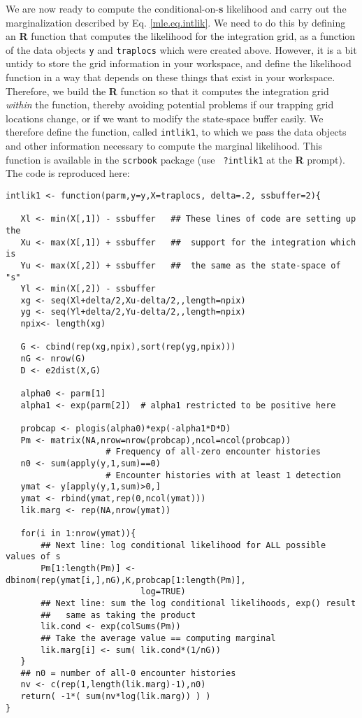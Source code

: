 We are now ready to compute the conditional-on-{\bf s} likelihood and
carry out the marginalization described by Eq. \ref{mle.eq.intlik}.
We need to do this by defining an {\bf R} function that computes the
likelihood for the integration grid, as a function of the data objects
\mbox{\tt y} and \mbox{\tt traplocs} which were created
above. However, it is a bit untidy to store the grid information in
your workspace, and define the likelihood function in a way that
depends on these things that exist in your workspace.  Therefore, we
build the {\bf R} function so that it computes the integration grid
{\it within} the function, thereby avoiding potential problems if our
trapping grid locations change, or if we want to modify the
state-space buffer easily.  We therefore define the function, called
\mbox{\tt intlik1}, to which we pass the data objects and other
information necessary to compute the marginal likelihood.  This
function is available in the \mbox{\tt scrbook} package (use {\tt
  ?intlik1} at the {\bf R} prompt).  The code is reproduced here:

{\small 
\begin{verbatim}
intlik1 <- function(parm,y=y,X=traplocs, delta=.2, ssbuffer=2){

   Xl <- min(X[,1]) - ssbuffer   ## These lines of code are setting up the 
   Xu <- max(X[,1]) + ssbuffer   ##  support for the integration which is
   Yu <- max(X[,2]) + ssbuffer   ##  the same as the state-space of "s"
   Yl <- min(X[,2]) - ssbuffer
   xg <- seq(Xl+delta/2,Xu-delta/2,,length=npix) 
   yg <- seq(Yl+delta/2,Yu-delta/2,,length=npix) 
   npix<- length(xg)

   G <- cbind(rep(xg,npix),sort(rep(yg,npix)))
   nG <- nrow(G)
   D <- e2dist(X,G)  

   alpha0 <- parm[1]
   alpha1 <- exp(parm[2])  # alpha1 restricted to be positive here
                      
   probcap <- plogis(alpha0)*exp(-alpha1*D*D)
   Pm <- matrix(NA,nrow=nrow(probcap),ncol=ncol(probcap))
                    # Frequency of all-zero encounter histories
   n0 <- sum(apply(y,1,sum)==0) 
                    # Encounter histories with at least 1 detection
   ymat <- y[apply(y,1,sum)>0,] 
   ymat <- rbind(ymat,rep(0,ncol(ymat)))
   lik.marg <- rep(NA,nrow(ymat))
   
   for(i in 1:nrow(ymat)){
       ## Next line: log conditional likelihood for ALL possible values of s
       Pm[1:length(Pm)] <- dbinom(rep(ymat[i,],nG),K,probcap[1:length(Pm)],
                           log=TRUE)
       ## Next line: sum the log conditional likelihoods, exp() result
       ##   same as taking the product
       lik.cond <- exp(colSums(Pm))
       ## Take the average value == computing marginal
       lik.marg[i] <- sum( lik.cond*(1/nG))  
   }
   ## n0 = number of all-0 encounter histories
   nv <- c(rep(1,length(lik.marg)-1),n0)
   return( -1*( sum(nv*log(lik.marg)) ) )
}
\end{verbatim}
}

